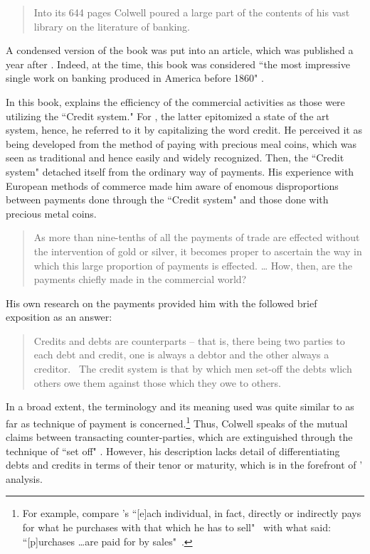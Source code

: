 \begin{quote}
Into its 644 pages Colwell poured a large part of the contents of his vast library on the literature of banking.~\citep[p.~819]{dorfman2}
\end{quote}

A condensed version of the book was put into an article, which was published a year after  \citep{colwell1860}. Indeed, at the time, this book was considered ``the most impressive single work on banking produced in America before 1860" \citep[p.~494]{selgin1989}. 

In this book, \cite{colwell1859,colwell1860} explains the efficiency of the commercial activities as those were utilizing the ``Credit system." For \citeauthor{colwell1859}, the latter epitomized a state of the art system, hence, he referred to it by capitalizing the word credit. He perceived it as being developed from the method of paying with precious meal coins, which was seen as traditional and hence easily and widely recognized. Then, the ``Credit system" detached itself from the ordinary way of payments. His experience with European methods of commerce made him aware of enomous disproportions between payments done through the ``Credit system" and those done with precious metal coins.

\begin{quote}
As more than nine-tenths of all the payments of trade are effected 
without the intervention of gold or silver, it becomes proper to ascertain 
the way in which this large proportion of payments is effected. \dots 
How, then, are the payments chiefly made in the commercial world?~\citep[p.~685]{colwell1860}
\end{quote}

His own research on the payments provided him with the followed brief exposition as an answer:

\begin{quote}
Credits and debts are counterparts -- that is, there being two parties to each debt and 
credit, one is always a debtor and the other always a creditor.~\citep[p.~688]{colwell1860}
The credit system is that by which men set-off the debts wlich others owe them against those which they owe to others.~\citep[p.~8]{colwell1859} 
\end{quote}

In a broad extent, the terminology and its meaning used \citeauthor{colwell1859} was quite similar to \citeauthor{innes1913} as far as technique of payment is concerned.\footnote{For example, compare \citeauthor{colwell1859}'s ``[e]ach individual, in fact, directly or indirectly pays for what he purchases with that which he has to sell"~\citep[p.~190]{colwell1859} with what \citeauthor{innes1913} said: ``[p]urchases \dots are paid for by sales"~\citep[p.~168]{innes1914}.} Thus, Colwell speaks of the mutual claims between transacting counter-parties, which are extinguished through the technique of ``set off" \citep[p.~693]{colwell1860}. However, his description lacks detail of differentiating debts and credits in terms of their tenor or maturity, which is in the forefront of \citeauthor{innes1913}' analysis.

